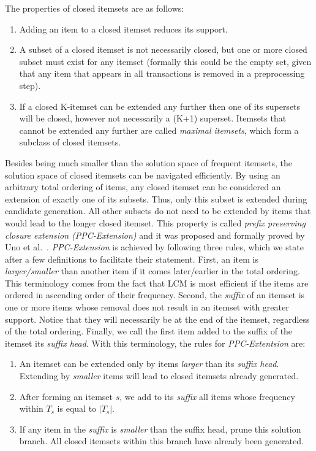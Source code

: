 \documentclass{sig-alternate}
\begin{document}
The properties of closed itemsets are as follows:
\begin{enumerate}
\item Adding an item to a closed itemset reduces its support. 
\item A subset of a closed itemset is not necessarily closed, but one or more closed subset must exist for any itemset (formally this could be the empty set, given that any item that appears in all transactions is removed in a preprocessing step). 
\item If a closed K-itemset can be extended any further then one of its supersets will be closed, however not necessarily a (K+1) superset. Itemsets that cannot be extended any further are called \emph{maximal itemsets}, which form a subclass of closed itemsets.
\end{enumerate}

Besides being much smaller than the solution space of frequent itemsets,
the solution space of closed itemsets can be navigated efficiently.
By using an arbitrary total ordering of items, any closed itemset can be
considered an extension of exactly one of its subsets.
Thus, only this subset is extended during candidate generation.
All other subsets do not need to be extended by items that would lead to
the longer closed itemset.
This property is called \emph{prefix preserving closure extension
(PPC-Extension)} and it was proposed and formally proved by
Uno et al.~\cite{uno2004lcm}.
\emph{PPC-Extension} is achieved by following three rules, which we state
after a few definitions to facilitate their statement.
First, an item is \emph{larger/smaller} than another item if it comes
later/earlier in the total ordering.
This terminology comes from the fact that LCM is most efficient if the items
are ordered in ascending order of their frequency.
Second, the \emph{suffix} of an itemset is one or more items whose removal
does not result in an itemset with greater support.
Notice that they will necessarily be at the end of the itemset,
regardless of the total ordering.
Finally, we call the first item added to the suffix of the itemset its
\emph{suffix head}.
With this terminology, the rules for \emph{PPC-Extentsion} are:
\begin{enumerate}
\item An itemset can be extended only by items \emph{larger} than its \emph{suffix head}. Extending by \emph{smaller} items will lead to closed itemsets already generated.
\item After forming an itemset $s$, we add to its \emph{suffix} all items whose frequency within $T_s$ is equal to $|T_s|$.
\item If any item in the \emph{suffix} is \emph{smaller} than the suffix head, prune this solution branch. All closed itemsets within this branch have already been generated.
\end{enumerate}
 
\end{document}
